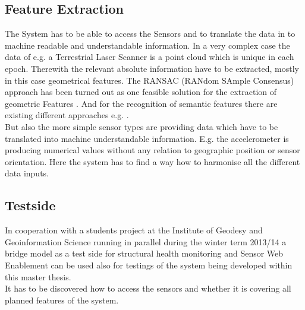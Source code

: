 \subsection{Feature Extraction}
The System has to be able to access the Sensors and to translate the data in to machine readable and understandable information. In a very complex case the data of e.g. a Terrestrial Laser Scanner  is a point cloud which is unique in each epoch. Therewith the relevant absolute information have to be extracted, mostly in this case geometrical features. The RANSAC (RANdom SAmple Consensus) approach has been turned out as one feasible solution for the extraction of geometric Features \citep{schnabel_efficient_2007}. And for the recognition of semantic features there are existing different approaches e.g. \citep{schnabel_efficient_2010}\citep{gumhold_feature_2001}.\\
But also the more simple sensor types are providing data which have to be translated into machine understandable information. E.g. the accelerometer is producing numerical values without any relation to geographic position or sensor orientation. Here the system has to find a way how to harmonise all the different data inputs.
\subsection{Testside}
In cooperation with a students project at the Institute of Geodesy and Geoinformation Science  running in parallel during the winter term 2013/14 a bridge model as a test side for structural health monitoring and Sensor Web Enablement can be used also for testings of the system being developed within this master thesis.\\
It has to be discovered how to access the sensors and whether it is covering all planned features of the system.